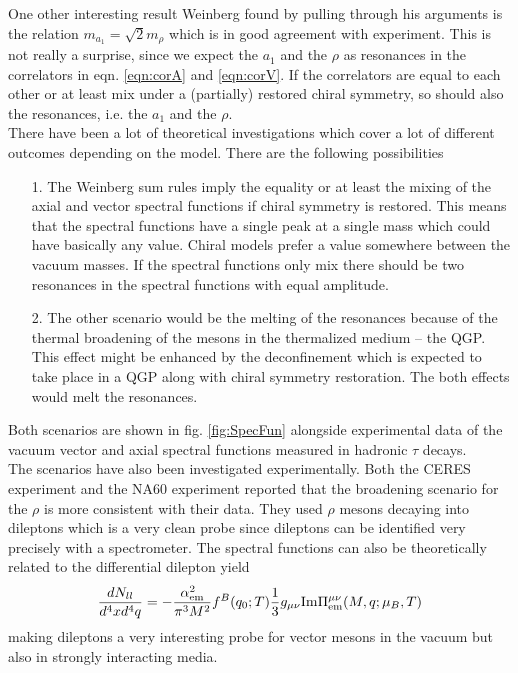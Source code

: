 One other interesting result Weinberg \cite{WeinbergAVmixing} found by pulling through his arguments is the relation $m_{a_1} = \sqrt{2}m_{\rho}$ which is in good agreement with experiment. This is not really a surprise, since we expect the $a_1$ and the $\rho$ as resonances in the correlators in eqn. \ref{eqn:corA} and \ref{eqn:corV}. If the correlators are equal to each other or at least mix under a (partially) restored chiral symmetry, so should also the resonances, i.e. the $a_1$ and the $\rho$. \\
There have been a lot of theoretical investigations which cover a lot of different outcomes depending on the model. There are the following possibilities \cite{ChiSym}
\begin{itemize}
\item[1.] The Weinberg sum rules imply the equality or at least the mixing of the axial and vector spectral functions if chiral symmetry is restored. This means that the spectral functions have a single peak at a single mass which could have basically any value. Chiral models prefer a value somewhere between the vacuum masses. If the spectral functions only mix there should be two resonances in the spectral functions with equal amplitude.
\item[2.] The other scenario would be the melting of the resonances because of the thermal broadening of the mesons in the thermalized medium -- the QGP. This effect might be enhanced by the deconfinement which is expected to take place in a QGP along with chiral symmetry restoration. The both effects would melt the resonances.
\end{itemize}
Both scenarios are shown in fig. \ref{fig:SpecFun} alongside experimental data of the vacuum vector and axial spectral functions measured in hadronic $\tau$ decays. \\
The scenarios have also been investigated experimentally. Both the CERES experiment \cite{CERESrho} and the NA60 experiment \cite{NA60rho} reported that the broadening scenario for the $\rho$ is more consistent with their data. They used $\rho$ mesons decaying into dileptons which is a very clean probe since dileptons can be identified very precisely with a spectrometer. The spectral functions can also be theoretically related to the differential dilepton yield \cite{RappChiRes}
\begin{equation}
\frac{dN_{ll}}{d^4xd^4q} = -\frac{\alpha_{\mathrm{em}}^2}{\pi^3M^2} f^B(q_0;T)\frac{1}{3} g_{\mu\nu} \mathrm{Im} \Pi^{\mu\nu}_{\mathrm{em}}(M,q;\mu_B,T)
\end{equation}
making dileptons a very interesting probe for vector mesons in the vacuum but also in strongly interacting media. 
